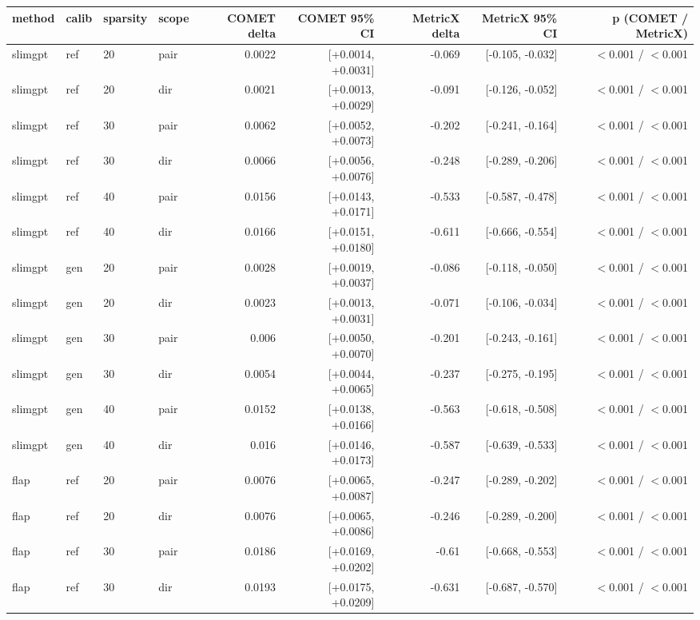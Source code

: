 \begin{tabular}{llllrrrrr}
\toprule
method & calib & sparsity & scope & COMET delta & COMET 95\% CI & MetricX delta & MetricX 95\% CI & p (COMET / MetricX) \\
\midrule
slimgpt & ref & 20 & pair & 0.0022 & [+0.0014, +0.0031] & -0.069 & [-0.105, -0.032] & $<$0.001 / $<$0.001 \\
slimgpt & ref & 20 & dir & 0.0021 & [+0.0013, +0.0029] & -0.091 & [-0.126, -0.052] & $<$0.001 / $<$0.001 \\
slimgpt & ref & 30 & pair & 0.0062 & [+0.0052, +0.0073] & -0.202 & [-0.241, -0.164] & $<$0.001 / $<$0.001 \\
slimgpt & ref & 30 & dir & 0.0066 & [+0.0056, +0.0076] & -0.248 & [-0.289, -0.206] & $<$0.001 / $<$0.001 \\
slimgpt & ref & 40 & pair & 0.0156 & [+0.0143, +0.0171] & -0.533 & [-0.587, -0.478] & $<$0.001 / $<$0.001 \\
slimgpt & ref & 40 & dir & 0.0166 & [+0.0151, +0.0180] & -0.611 & [-0.666, -0.554] & $<$0.001 / $<$0.001 \\
slimgpt & gen & 20 & pair & 0.0028 & [+0.0019, +0.0037] & -0.086 & [-0.118, -0.050] & $<$0.001 / $<$0.001 \\
slimgpt & gen & 20 & dir & 0.0023 & [+0.0013, +0.0031] & -0.071 & [-0.106, -0.034] & $<$0.001 / $<$0.001 \\
slimgpt & gen & 30 & pair & 0.006 & [+0.0050, +0.0070] & -0.201 & [-0.243, -0.161] & $<$0.001 / $<$0.001 \\
slimgpt & gen & 30 & dir & 0.0054 & [+0.0044, +0.0065] & -0.237 & [-0.275, -0.195] & $<$0.001 / $<$0.001 \\
slimgpt & gen & 40 & pair & 0.0152 & [+0.0138, +0.0166] & -0.563 & [-0.618, -0.508] & $<$0.001 / $<$0.001 \\
slimgpt & gen & 40 & dir & 0.016 & [+0.0146, +0.0173] & -0.587 & [-0.639, -0.533] & $<$0.001 / $<$0.001 \\
flap & ref & 20 & pair & 0.0076 & [+0.0065, +0.0087] & -0.247 & [-0.289, -0.202] & $<$0.001 / $<$0.001 \\
flap & ref & 20 & dir & 0.0076 & [+0.0065, +0.0086] & -0.246 & [-0.289, -0.200] & $<$0.001 / $<$0.001 \\
flap & ref & 30 & pair & 0.0186 & [+0.0169, +0.0202] & -0.61 & [-0.668, -0.553] & $<$0.001 / $<$0.001 \\
flap & ref & 30 & dir & 0.0193 & [+0.0175, +0.0209] & -0.631 & [-0.687, -0.570] & $<$0.001 / $<$0.001 \\

\end{tabular}
